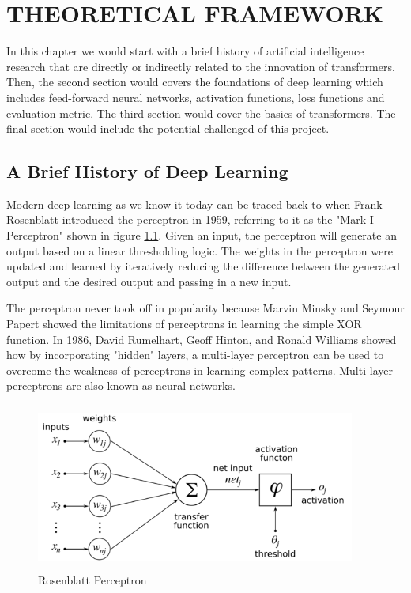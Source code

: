 \chapter{THEORETICAL FRAMEWORK}
\label{chap: 3}

In this chapter we would start with a brief history of artificial intelligence research that are directly or indirectly related to the innovation of transformers. Then, the second section would covers the foundations of deep learning which includes feed-forward neural networks, activation functions, loss functions and evaluation metric. The third section would cover the basics of transformers. The final section would include the potential challenged of this project.

\section{A Brief History of Deep Learning}

Modern deep learning as we know it today can be traced back to when Frank Rosenblatt introduced the perceptron in 1959, referring to it as the "Mark I Perceptron" shown in figure \ref{fig:perceptron}. Given an input, the perceptron will generate an output based on a linear thresholding logic. The weights in the perceptron were updated and learned by iteratively reducing the difference between the generated output and the desired output and passing in a new input.

The perceptron never took off in popularity because Marvin Minsky and Seymour Papert showed the limitations of perceptrons in learning the simple XOR function. In 1986, David Rumelhart, Geoff Hinton, and Ronald Williams showed how by incorporating "hidden" layers, a multi-layer perceptron can be used to overcome the weakness of perceptrons in learning complex patterns. Multi-layer perceptrons are also known as neural networks.

\begin{figure}[ht]
\includegraphics[width=10.5cm, height=5.5cm]{images/Rosenblattperceptron.png}
\centering
\caption{Rosenblatt Perceptron}
\label{fig:perceptron}
\end{figure}

